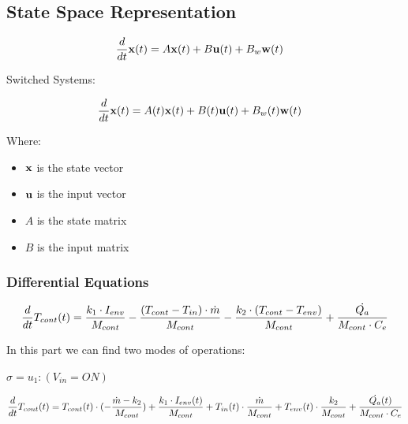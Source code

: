 \documentclass[a4paper,12pt,twoside,openright]{book}
\begin{document}
\newpage
\subsection{State Space Representation}

\begin{align*}
  \frac{d}{dt}\mathbf{x}(t) &= A\mathbf{x}(t) + B\mathbf{u}(t) + B_w\mathbf{w}(t)
\end{align*}

Switched Systems:

\begin{align*}
  \frac{d}{dt}\mathbf{x}(t) &= A(t)\mathbf{x}(t) + B(t)\mathbf{u}(t) + B_w(t)\mathbf{w}(t)
\end{align*}

Where:
\begin{itemize}
\item $\mathbf{x}$ is the state vector
\item $\mathbf{u}$ is the input vector
\item $A$ is the state matrix
\item $B$ is the input matrix
\end{itemize}


\subsubsection{Differential Equations}


  \begin{equation}
          \frac{d}{dt}T_{cont}(t) = \frac{k_1\cdot I_{env}}{M_{cont}} - \frac{(T_{cont}-T_{in})\cdot\dot{m}}{M_{cont}} - \frac{k_2\cdot(T_{cont}-T_{env})}{M_{cont}} + \frac{\dot{Q_{a}}}{M_{cont}\cdot C_e}        
  \end{equation}


In this part we can find two modes of operations:

\vspace{5mm}

$\sigma = u_1: (V_{in} = ON)$

\begin{equation}
       \frac{d}{dt}T_{cont}(t) = T_{cont}(t)\cdot(-\frac{\dot{m}-k_2}{M_{cont}})+\frac{k_1\cdot I_{env}(t)}{M_{cont}} + T_{in}(t)\cdot\frac{\dot{m}}{M_{cont}} + T_{env}(t)\cdot\frac{k_2}{M_{cont}} +  \frac{\dot{Q_{a}}(t)}{M_{cont}\cdot C_e}  
\end{equation}

        
\end{document}

